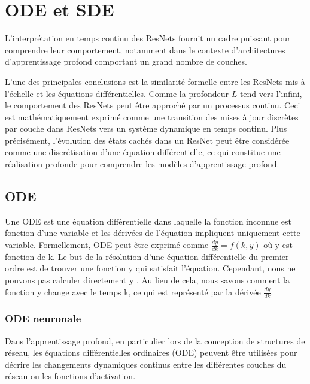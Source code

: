 \chapter{ODE et SDE}
L’interprétation en temps continu des ResNets fournit un cadre puissant pour comprendre leur comportement, notamment dans le contexte d’architectures d’apprentissage profond comportant un grand nombre de couches.

L’une des principales conclusions est la similarité formelle entre les ResNets mis à l'échelle et les équations différentielles. Comme la profondeur \(L\) tend vers l’infini, le comportement des ResNets peut être approché par un processus continu. Ceci est mathématiquement exprimé comme une transition des mises à jour discrètes par couche dans ResNets vers un système dynamique en temps continu. Plus précisément, l’évolution des états cachés dans un ResNet peut être considérée comme une discrétisation d’une équation différentielle, ce qui constitue une réalisation profonde pour comprendre les modèles d’apprentissage profond.


\section{ODE}
Une ODE est une équation différentielle dans laquelle la fonction inconnue est fonction d'une variable et les dérivées de l'équation impliquent uniquement cette variable. Formellement, ODE peut être exprimé comme $\frac{dy}{dk}=f(k,y)$ où y est fonction de k.
Le but de la résolution d’une équation différentielle du premier ordre est de trouver une fonction y qui satisfait l’équation. Cependant, nous ne pouvons pas calculer directement y
 . Au lieu de cela, nous savons comment la fonction y change avec le temps k, ce qui est représenté par la dérivée $\frac{dy}{dk}$.

 \subsection{ODE neuronale}
 Dans l'apprentissage profond, en particulier lors de la conception de structures de réseau, les équations différentielles ordinaires (ODE) peuvent être utilisées pour décrire les changements dynamiques continus entre les différentes couches du réseau ou les fonctions d'activation.

